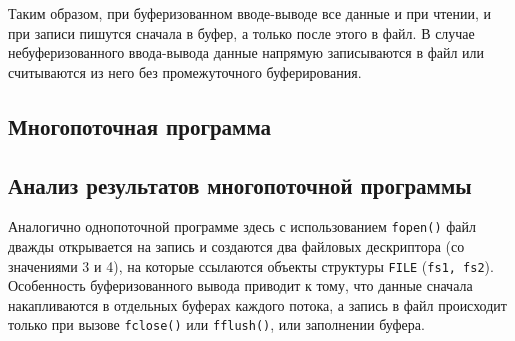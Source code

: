 

Таким образом, при буферизованном вводе-выводе все данные и при чтении, и при записи пишутся сначала в буфер, а только после этого в файл. В случае небуферизованного ввода-вывода данные напрямую записываются в файл или считываются из него без промежуточного буферирования.

\subsection{Многопоточная программа}
\captionsetup{singlelinecheck = false, justification=raggedright}


\captionsetup{singlelinecheck = false, justification=raggedright}



\captionsetup{singlelinecheck = false, justification=raggedright}


\captionsetup{singlelinecheck = false, justification=raggedright}



\subsection{Анализ результатов многопоточной программы}
Аналогично однопоточной программе здесь с использованием \newline \texttt{fopen()} файл дважды открывается на запись и создаются два файловых дескриптора (со значениями 3 и 4), на которые ссылаются объекты структуры \texttt{FILE} (\texttt{fs1, fs2}). Особенность буферизованного вывода приводит к тому, что данные сначала накапливаются в отдельных буферах каждого потока, а запись в файл происходит только при вызове \texttt{fclose()} или \texttt{fflush()}, или заполнении буфера.

